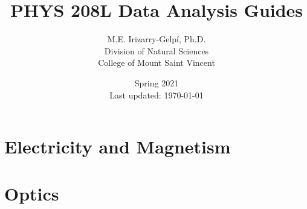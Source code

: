\documentclass[letterpaper,11pt]{report}
\begin{document}
%
\title{\Huge{PHYS 208L Data Analysis Guides}}
\author{M.E. Irizarry-Gelp\'{i}, Ph.D. \\ Division of Natural Sciences \\ College of Mount Saint Vincent}
\date{Spring 2021 \\ Last updated: \today{ }\currenttime}
%
\maketitle
\tableofcontents
%


%
\part{Electricity and Magnetism}
%




% 

% 
%
\part{Optics}






%
\end{document}
